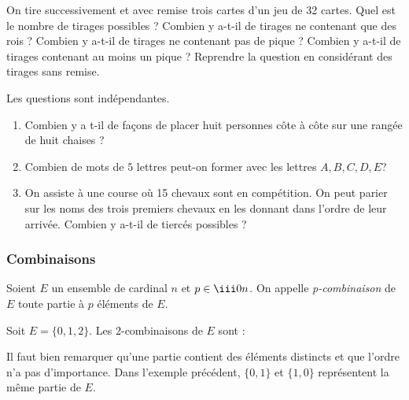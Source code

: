\documentclass[french,11pt,twoside]{VcCours}
\begin{document}
\begin{Exemple}
On tire successivement et avec remise trois cartes d'un jeu de 32 cartes. Quel est le nombre de tirages possibles ? Combien y a-t-il de tirages ne contenant que des rois ? Combien y a-t-il de tirages ne contenant pas de pique ? Combien y a-t-il de tirages contenant au moins un pique ? Reprendre la question en considérant des tirages sans remise.


\newpage

\vspace*{3cm}
\end{Exemple}



\begin{ApplicationDirecte}{} Les questions sont indépendantes.
\begin{enumerate}
\item Combien y a t-il de façons de placer huit personnes côte à côte sur une rangée de huit chaises ?
\item Combien de mots de $5$ lettres peut-on former avec les lettres $A,B,C,D,E$?
\item On assiste à une course où 15 chevaux sont en compétition. On peut parier sur les noms des trois premiers chevaux en les donnant dans l'ordre de leur arrivée. Combien y a-t-il de tiercés possibles ?
\end{enumerate}
\end{ApplicationDirecte}

\subsubsection{Combinaisons}

\begin{Definition}{}
Soient $E$ un ensemble de cardinal $n$ et $p \in \iii 0n$. On appelle \emph{p-combinaison} de $E$ toute partie à $p$ éléments de $E$.
\end{Definition}


\begin{Exemple}
Soit $E= \lbrace 0,1,2 \rbrace$. Les 2-combinaisons de $E$ sont : 
\end{Exemple}


\begin{Remarque}[\alerte]{}
Il faut bien remarquer qu'une partie contient des éléments distincts et que l'ordre n'a pas d'importance. Dans l'exemple précédent, $\lbrace 0,1 \rbrace$ et $ \lbrace1,0 \rbrace$ représentent la même partie de $E$.
\end{Remarque}
\end{document}
